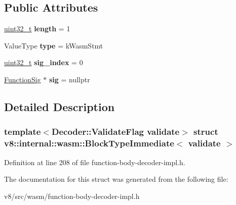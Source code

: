 \subsection*{Public Attributes}
\begin{DoxyCompactItemize}
\item 
\mbox{\label{structv8_1_1internal_1_1wasm_1_1BlockTypeImmediate_a444f3a30faef4b2221c2245d2978637e}} 
\mbox{\hyperlink{classuint32__t}{uint32\+\_\+t}} {\bfseries length} = 1
\item 
\mbox{\label{structv8_1_1internal_1_1wasm_1_1BlockTypeImmediate_a898307323fd7a0bfd04f4a5d329afec1}} 
Value\+Type {\bfseries type} = k\+Wasm\+Stmt
\item 
\mbox{\label{structv8_1_1internal_1_1wasm_1_1BlockTypeImmediate_a3e89e37151a892a91be716071f3e94ec}} 
\mbox{\hyperlink{classuint32__t}{uint32\+\_\+t}} {\bfseries sig\+\_\+index} = 0
\item 
\mbox{\label{structv8_1_1internal_1_1wasm_1_1BlockTypeImmediate_ade5029d69121253dcc10f6370d42a087}} 
\mbox{\hyperlink{classv8_1_1internal_1_1Signature}{Function\+Sig}} $\ast$ {\bfseries sig} = nullptr
\end{DoxyCompactItemize}


\subsection{Detailed Description}
\subsubsection*{template$<$Decoder\+::\+Validate\+Flag validate$>$\newline
struct v8\+::internal\+::wasm\+::\+Block\+Type\+Immediate$<$ validate $>$}



Definition at line 208 of file function-\/body-\/decoder-\/impl.\+h.



The documentation for this struct was generated from the following file\+:\begin{DoxyCompactItemize}
\item 
v8/src/wasm/function-\/body-\/decoder-\/impl.\+h\end{DoxyCompactItemize}
